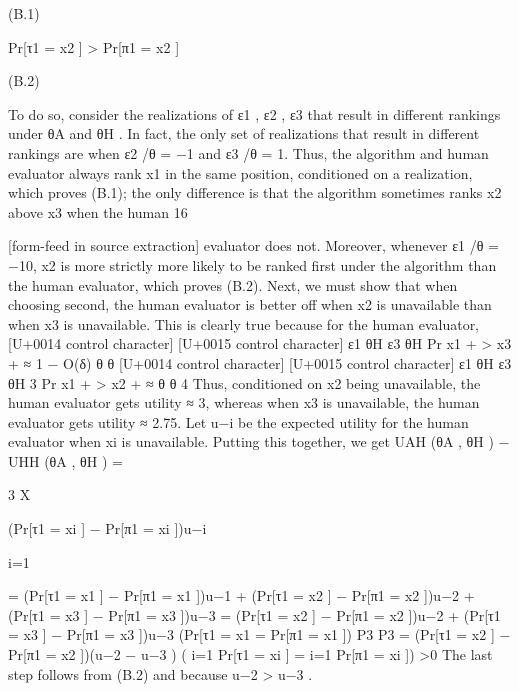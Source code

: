 \documentclass[10pt]{article}
\begin{document}
\begin{ReviewVerbatim}
(B.1)

Pr[τ1 = x2 ] > Pr[π1 = x2 ]

(B.2)

To do so, consider the realizations of ε1 , ε2 , ε3 that result in different rankings under θA and θH . In fact,
the only set of realizations that result in different rankings are when ε2 /θ = −1 and ε3 /θ = 1. Thus,
the algorithm and human evaluator always rank x1 in the same position, conditioned on a realization,
which proves (B.1); the only difference is that the algorithm sometimes ranks x2 above x3 when the human
16


[form-feed in source extraction]
evaluator does not. Moreover, whenever ε1 /θ = −10, x2 is more strictly more likely to be ranked first under
the algorithm than the human evaluator, which proves (B.2).
Next, we must show that when choosing second, the human evaluator is better off when x2 is unavailable
than when x3 is unavailable. This is clearly true because for the human evaluator,
[U+0014 control character]
[U+0015 control character]
ε1 θH
ε3 θH
Pr x1 +
> x3 +
≈ 1 − O(δ)
θ
θ
[U+0014 control character]
[U+0015 control character]
ε1 θH
ε3 θH
3
Pr x1 +
> x2 +
≈
θ
θ
4
Thus, conditioned on x2 being unavailable, the human evaluator gets utility ≈ 3, whereas when x3 is
unavailable, the human evaluator gets utility ≈ 2.75. Let u−i be the expected utility for the human evaluator
when xi is unavailable. Putting this together, we get
UAH (θA , θH ) − UHH (θA , θH )
=

3
X

(Pr[τ1 = xi ] − Pr[π1 = xi ])u−i

i=1

= (Pr[τ1 = x1 ] − Pr[π1 = x1 ])u−1 + (Pr[τ1 = x2 ] − Pr[π1 = x2 ])u−2 + (Pr[τ1 = x3 ] − Pr[π1 = x3 ])u−3
= (Pr[τ1 = x2 ] − Pr[π1 = x2 ])u−2 + (Pr[τ1 = x3 ] − Pr[π1 = x3 ])u−3
(Pr[τ1 = x1 = Pr[π1 = x1 ])
P3
P3
= (Pr[τ1 = x2 ] − Pr[π1 = x2 ])(u−2 − u−3 )
( i=1 Pr[τ1 = xi ] = i=1 Pr[π1 = xi ])
>0
The last step follows from (B.2) and because u−2 > u−3 .
\end{ReviewVerbatim}
\end{document}
